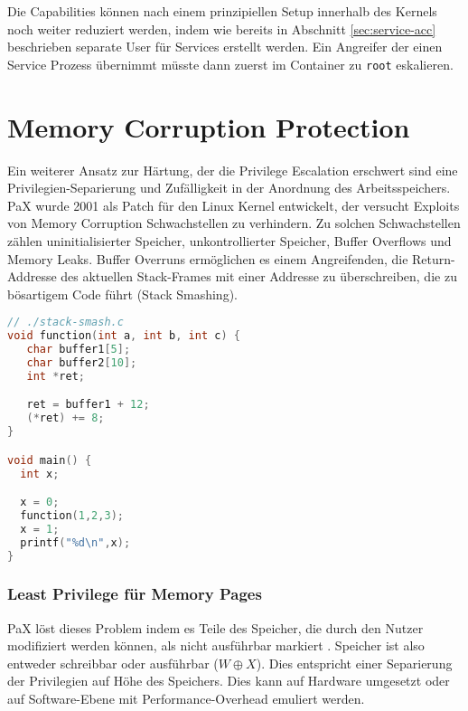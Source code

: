 Die Capabilities können nach einem prinzipiellen Setup innerhalb des Kernels noch weiter reduziert werden, indem wie bereits in Abschnitt \ref{sec:service-acc} beschrieben separate User für Services erstellt werden. Ein Angreifer der einen Service Prozess übernimmt müsste dann zuerst im Container zu \texttt{root} eskalieren.  



\section{Memory Corruption Protection}

Ein weiterer Ansatz zur Härtung, der die Privilege Escalation erschwert sind eine Privilegien-Separierung und Zufälligkeit in der Anordnung des Arbeitsspeichers. PaX wurde 2001 als Patch für den Linux Kernel entwickelt, der versucht Exploits von Memory Corruption Schwachstellen zu verhindern. Zu solchen Schwachstellen zählen uninitialisierter Speicher, unkontrollierter Speicher, Buffer Overflows und Memory Leaks. 
Buffer Overruns ermöglichen es einem Angreifenden, die Return-Addresse des aktuellen Stack-Frames mit einer Addresse zu überschreiben, die zu bösartigem Code führt (Stack Smashing). 

\begin{lstlisting}[language=c,caption={Stack Smashing, das ein Überspringen der \texttt{x = 1} Instruktion bewirkt. Aus \cite{alpeh1996smashing}}]
// ./stack-smash.c
void function(int a, int b, int c) {
   char buffer1[5];
   char buffer2[10];
   int *ret;

   ret = buffer1 + 12;
   (*ret) += 8;
}

void main() {
  int x;

  x = 0;
  function(1,2,3);
  x = 1;
  printf("%d\n",x);
}
\end{lstlisting}


\subsubsection{Least Privilege für Memory Pages}
\label{sec:mem-sec}

PaX löst dieses Problem indem es Teile des Speicher, die durch den Nutzer modifiziert werden können, als nicht ausführbar markiert \cite{schacham_2004}. Speicher ist also entweder schreibbar oder ausführbar ($W \oplus X$). Dies entspricht einer Separierung der Privilegien auf Höhe des Speichers. Dies kann auf Hardware umgesetzt oder auf Software-Ebene mit Performance-Overhead emuliert werden.

